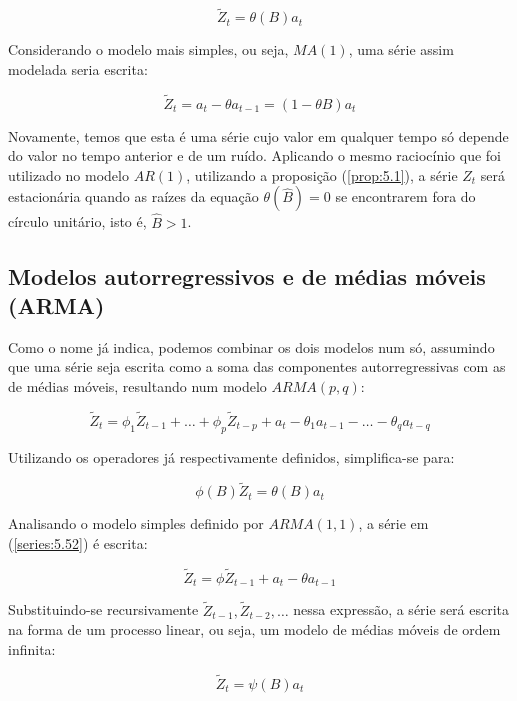 \begin{equation}\label{series:5.45}
\tilde{Z}_t = \theta(B) a_t 
\end{equation}

Considerando o modelo mais simples, ou seja, $MA(1)$, uma série assim modelada seria escrita:

\[
\tilde{Z}_t = a_t - \theta a_{t-1} = (1 - \theta B)a_t
\]

Novamente, temos que esta é uma série cujo valor em qualquer tempo só depende do valor no tempo anterior e de um ruído. Aplicando o mesmo raciocínio que foi utilizado no modelo $AR(1)$, utilizando a proposição (\ref{prop:5.1}), a série $Z_t$ será estacionária quando as raízes da equação $\theta(\hat{B}) = 0$ se encontrarem fora do círculo unitário, isto é, $\hat{B} > 1$.


\subsection{Modelos autorregressivos e de médias móveis (ARMA)}

Como o nome já indica, podemos combinar os dois modelos num só, assumindo que uma série seja escrita como a soma das componentes autorregressivas com as de médias móveis, resultando num modelo $ARMA(p, q)$:

\begin{equation}\label{series:5.52}
\tilde{Z}_t = \phi_1 \tilde{Z}_{t-1} + \ldots + \phi_p \tilde{Z}_{t-p} + a_t - \theta_1 a_{t-1} - \ldots - \theta_q a_{t-q}
\end{equation}

Utilizando os operadores já respectivamente definidos, simplifica-se para:

\begin{equation}\label{series:5.53}
\phi(B)\tilde{Z}_t = \theta(B)a_t
\end{equation}

Analisando o modelo simples definido por $ARMA(1, 1)$, a série em (\ref{series:5.52}) é escrita:

\begin{equation}\label{series:5.54}
\tilde{Z}_t = \phi \tilde{Z}_{t-1} + a_t - \theta a_{t-1}
\end{equation}

Substituindo-se recursivamente $\tilde{Z}_{t-1}, \tilde{Z}_{t-2}, \ldots$ nessa expressão, a série será escrita na forma de um processo linear, ou seja, um modelo de médias móveis de ordem infinita:

\[
\tilde{Z}_t = \psi(B)a_t
\]

